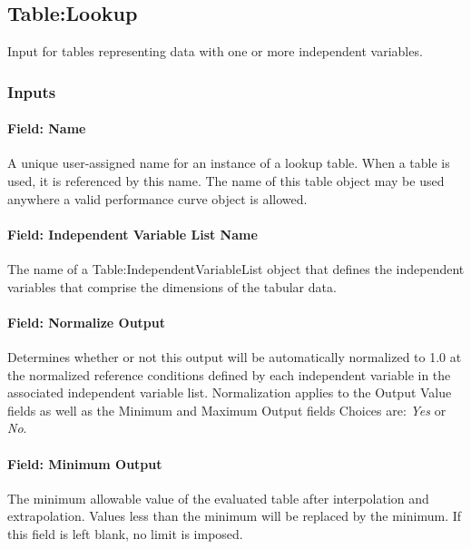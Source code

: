 \subsection{Table:Lookup}\label{tablelookup}

Input for tables representing data with one or more independent
variables.

\subsubsection{Inputs}\label{inputs}

\paragraph{Field: Name}\label{field-name}

A unique user-assigned name for an instance of a lookup table. When a
table is used, it is referenced by this name. The name of this table
object may be used anywhere a valid performance curve object is allowed.

\paragraph{Field: Independent Variable List
Name}\label{field-independent-variable-list-name}

The name of a Table:IndependentVariableList object that defines the
independent variables that comprise the dimensions of the tabular data.

\paragraph{Field: Normalize Output}\label{field-normalize-output}

Determines whether or not this output will be automatically normalized
to 1.0 at the normalized reference conditions defined by each
independent variable in the associated independent variable list.
Normalization applies to the Output Value fields as well as the Minimum
and Maximum Output fields Choices are: \emph{Yes} or \emph{No}.

\paragraph{Field: Minimum Output}\label{field-minimum-output}

The minimum allowable value of the evaluated table after interpolation
and extrapolation. Values less than the minimum will be replaced by the
minimum. If this field is left blank, no limit is imposed.

